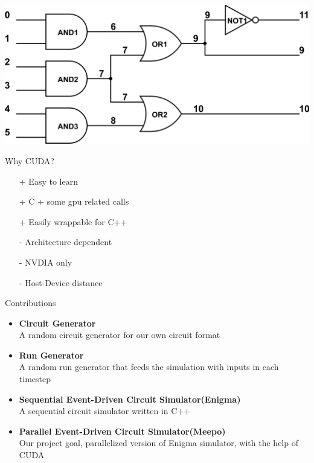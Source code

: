 \documentclass[aspectratio=1610]{beamer}
\begin{document}
\begin{frame}
\centering \includegraphics[height=0.75\textheight]{senior_demo.png}
\end{frame}

\begin{frame}{Why CUDA?}
\begin{itemize}
\item[+] Easy to learn
\item[+] C + some gpu related calls
\item[+] Easily wrappable for C++
\item[-] Architecture dependent
\item[-] NVDIA only
\item[-] Host-Device distance
\end{itemize}
\end{frame}
\begin{frame}{Contributions}
\begin{itemize}
\item \textbf{Circuit Generator} \\ A random circuit generator for our own circuit format
\item \textbf{Run Generator} \\ A random run generator that feeds the simulation with inputs in each timestep
\item \textbf{Sequential Event-Driven Circuit Simulator(Enigma)} \\ A sequential circuit simulator written in C++
\item \textbf{Parallel Event-Driven Circuit Simulator(Meepo)} \\ Our project goal, parallelized version of Enigma simulator, 
with the help of CUDA
\end{itemize}
\end{frame}
\end{document}
